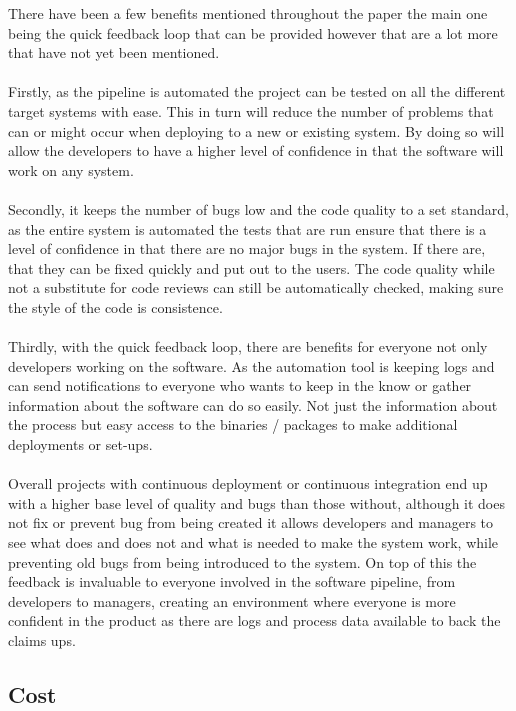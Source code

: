 There have been a few benefits mentioned throughout the paper the main one being the quick feedback loop that can be provided however that are a lot more that have not yet been mentioned.
\\\\
Firstly, as the pipeline is automated the project can be tested on all the different target systems with ease. This in turn will reduce the number of problems that can or might occur when deploying to a new or existing system. By doing so will allow the developers to have a higher level of confidence in that the software will work on any system.
\\\\
Secondly, it keeps the number of bugs low and the code quality to a set standard,  as the entire system is automated the tests that are run ensure that there is a level of confidence in that there are no major bugs in the system. If there are, that they can be fixed quickly and put out to the users. The code quality while not a substitute for code reviews can still be automatically checked, making sure the style of the code is consistence. 
\\\\
Thirdly, with the quick feedback loop, there are benefits for everyone not only developers working on the software. As the automation tool is keeping logs and can send notifications to everyone who wants to keep in the know or gather information about the software can do so easily. Not just the information about the process but easy access to the binaries / packages to make additional deployments or set-ups.
\\\\
Overall projects with continuous deployment or continuous integration end up with a higher base level of quality and bugs than those without, although it does not fix or prevent bug from being created it allows developers and managers to see what does and does not and what is needed to make the system work, while preventing old bugs from being introduced to the system. On top of this the feedback is invaluable to everyone involved in the software pipeline, from developers to managers, creating an environment where everyone is more confident in the product as there are logs and process data available to back the claims ups.


\subsection{Cost}


